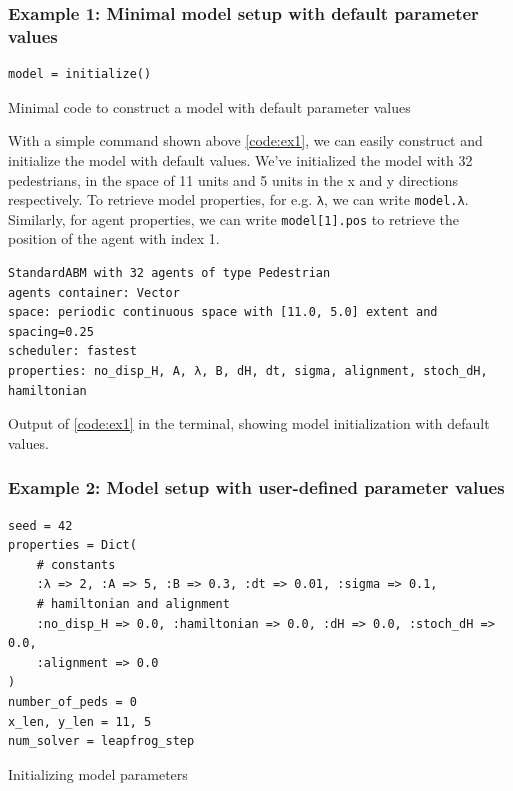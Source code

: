 \subsubsection*{Example 1: Minimal model setup with default parameter values}
\begin{listing}[H]
\begin{verbatim}
model = initialize()
\end{verbatim}
\caption{Minimal code to construct a model with default parameter values}
\label{code:ex1}
\end{listing}
With a simple command shown above \autoref{code:ex1}, we can easily construct and initialize the model with default values. We've initialized the model with 32 pedestrians, in the space of 11 units and 5 units in the x and y directions respectively. To retrieve model properties, for e.g. \texttt{λ}, we can write \texttt{model.λ}. Similarly, for agent properties, we can write \texttt{model[1].pos} to retrieve the position of the agent with index 1.
\begin{listing}[H]
\begin{verbatim}
StandardABM with 32 agents of type Pedestrian
agents container: Vector
space: periodic continuous space with [11.0, 5.0] extent and spacing=0.25
scheduler: fastest
properties: no_disp_H, A, λ, B, dH, dt, sigma, alignment, stoch_dH, 
hamiltonian    
\end{verbatim}
\caption{Output of \autoref{code:ex1} in the terminal, showing model initialization with default values.}
\label{code:repl_ex1}
\end{listing}

\subsubsection*{Example 2: Model setup with user-defined parameter values}
\label{section:ex2}

\begin{listing}[H]
\begin{verbatim}
seed = 42
properties = Dict(
    # constants
    :λ => 2, :A => 5, :B => 0.3, :dt => 0.01, :sigma => 0.1,
    # hamiltonian and alignment
    :no_disp_H => 0.0, :hamiltonian => 0.0, :dH => 0.0, :stoch_dH => 0.0,
    :alignment => 0.0
)
number_of_peds = 0
x_len, y_len = 11, 5
num_solver = leapfrog_step
\end{verbatim}
\caption{Initializing model parameters}
\label{code:ex2}
\end{listing}

